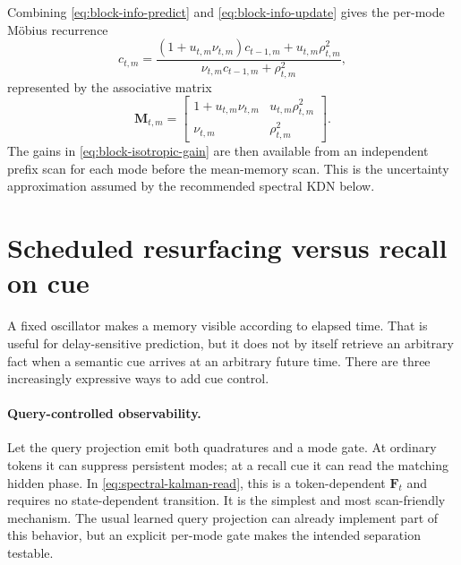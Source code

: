\documentclass[11pt]{article}
\newcommand{\ve}[1]{\boldsymbol{#1}}
\begin{document}
Combining \eqref{eq:block-info-predict} and \eqref{eq:block-info-update} gives the per-mode
M\"obius recurrence
\begin{equation}
  c_{t,m}
  =\frac{(1+u_{t,m}\nu_{t,m})c_{t-1,m}
          +u_{t,m}\rho_{t,m}^2}
         {\nu_{t,m}c_{t-1,m}+\rho_{t,m}^2},
  \label{eq:block-info-mobius}
\end{equation}
represented by the associative matrix
\begin{equation}
  \ve{M}_{t,m}
  =
  \begin{bmatrix}
    1+u_{t,m}\nu_{t,m} & u_{t,m}\rho_{t,m}^2\\
    \nu_{t,m} & \rho_{t,m}^2
  \end{bmatrix}.
  \label{eq:block-info-matrix}
\end{equation}
The gains in \eqref{eq:block-isotropic-gain} are then available from an independent prefix
scan for each mode before the mean-memory scan. This is the uncertainty approximation assumed
by the recommended spectral KDN below.


\section{Scheduled resurfacing versus recall on cue}

A fixed oscillator makes a memory visible according to elapsed time. That is useful for
delay-sensitive prediction, but it does not by itself retrieve an arbitrary fact when a
semantic cue arrives at an arbitrary future time. There are three increasingly expressive
ways to add cue control.

\paragraph{Query-controlled observability.}
Let the query projection emit both quadratures and a mode gate. At ordinary tokens it can
suppress persistent modes; at a recall cue it can read the matching hidden phase. In
\eqref{eq:spectral-kalman-read}, this is a token-dependent $\ve{F}_t$ and requires no
state-dependent transition. It is the simplest and most scan-friendly mechanism. The usual
learned query projection can already implement part of this behavior, but an explicit
per-mode gate makes the intended separation testable.
\end{document}
